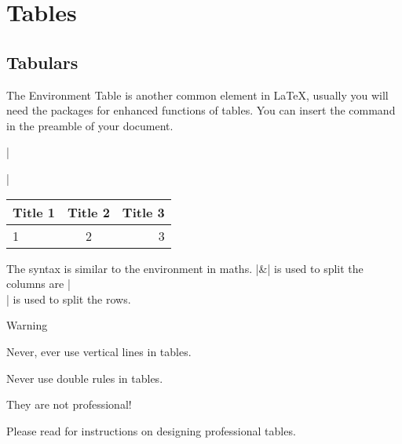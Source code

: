\section{Tables}

\subsection{Tabulars}

\begin{frame}[fragile]{The  Environment}
	Table is another common element in \LaTeX, usually you will need the  packages for enhanced functions of tables. You can insert the command in the preamble of your document.

\begin{command}
\LC|\usepackage{booktabs, multirow}|
\end{command}

\begin{latexexamplesplit}
\begin{tabular}{lcr}
  \toprule
  Title 1 & Title 2 & Title 3 \\
  \midrule
  1 & 2 & 3 \\
  \bottomrule
\end{tabular}
\end{latexexamplesplit}

The syntax is similar to the  environment in maths. \LC|&| is used to split the columns are \LC|\\| is used to split the rows.

\end{frame}

\begin{frame}{Warning}
  \begin{warning}
      Never, ever use vertical lines in tables.
      
      Never use double rules in tables.
  \end{warning}
  \medskip
  They are not professional!
  
  Please read  for instructions on designing professional tables.
\end{frame}


